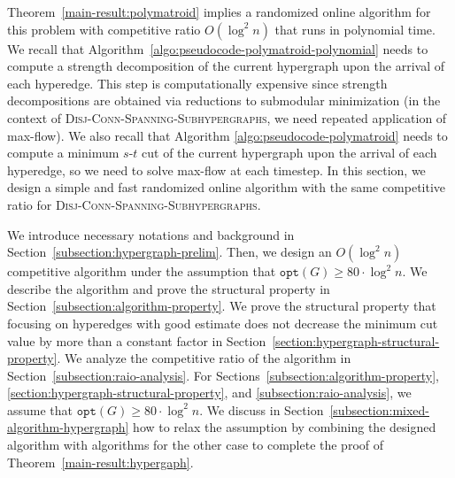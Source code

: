 \documentclass[11pt]{article}
\theoremstyle{definition}
\newcommand{\DCSS}{\textsc{Disj-Conn-Spanning-Subhypergraphs}\xspace}
\newcommand{\opt}{\texttt{opt}}
\begin{document}
Theorem~\ref{main-result:polymatroid} implies a randomized online algorithm for this problem with competitive ratio $O(\log^2 n)$ that runs in polynomial time. We recall that Algorithm~\ref{algo:pseudocode-polymatroid-polynomial} needs to compute a strength decomposition of the current hypergraph upon the arrival of each hyperedge. This step is computationally expensive since strength decompositions are obtained via reductions to submodular minimization (in the context of \DCSS, we need repeated application of max-flow). 
We also recall that Algorithm \ref{algo:pseudocode-polymatroid} needs to compute a minimum $s$-$t$ cut of the current hypergraph upon the arrival of each hyperedge, so we need to solve max-flow at each timestep. 
In this section, we design a simple and fast randomized online algorithm with the same competitive ratio for \DCSS. 

We introduce necessary notations and background in Section~\ref{subsection:hypergraph-prelim}. Then, we design an $O(\log^2 n)$ competitive algorithm under the assumption that $\opt(G)\geq 80\cdot \log^2 n$. We describe the algorithm and prove the structural property in Section~\ref{subsection:algorithm-property}. We prove the structural property that focusing on hyperedges with good estimate does not decrease the minimum cut value by more than a constant factor in Section~\ref{section:hypergraph-structural-property}. We analyze the competitive ratio of the algorithm in Section~\ref{subsection:raio-analysis}. For Sections~\ref{subsection:algorithm-property}, \ref{section:hypergraph-structural-property}, and \ref{subsection:raio-analysis}, we assume that $\opt(G)\geq 80\cdot \log^2 n$. We discuss in Section~\ref{subsection:mixed-algorithm-hypergraph} how to relax the assumption by combining the designed algorithm with algorithms for the other case to complete the proof of Theorem~\ref{main-result:hypergaph}.
\end{document}
